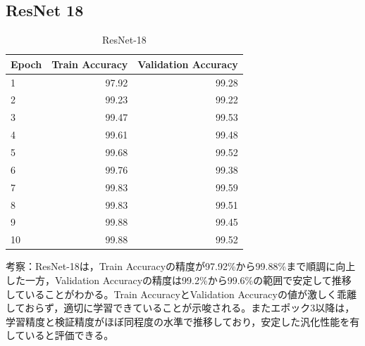\documentclass[a4paper,11pt,titlepage]{jsarticle}
\begin{document}
\subsection{ResNet 18}
\begin{table}[H]
\centering
\caption{ResNet-18}
\label{tab:ResNet18}
\begin{tabular}{lrr}
\hline
 Epoch &  Train Accuracy &  Validation Accuracy \\
\hline
     1 &           97.92 &                99.28 \\
     2 &           99.23 &                99.22 \\
     3 &           99.47 &                99.53 \\
     4 &           99.61 &                99.48 \\
     5 &           99.68 &                99.52 \\
     6 &           99.76 &                99.38 \\
     7 &           99.83 &                99.59 \\
     8 &           99.83 &                99.51 \\
     9 &           99.88 &                99.45 \\
    10 &           99.88 &                99.52 \\
\hline
\end{tabular}
\end{table}




考察：ResNet-18は，Train Accuracyの精度が97.92\%から99.88\%まで順調に向上した一方，Validation Accuracyの精度は99.2\%から99.6\%の範囲で安定して推移していることがわかる。Train AccuracyとValidation Accuracyの値が激しく乖離しておらず，適切に学習できていることが示唆される。またエポック3以降は，学習精度と検証精度がほぼ同程度の水準で推移しており，安定した汎化性能を有していると評価できる。
\end{document}
